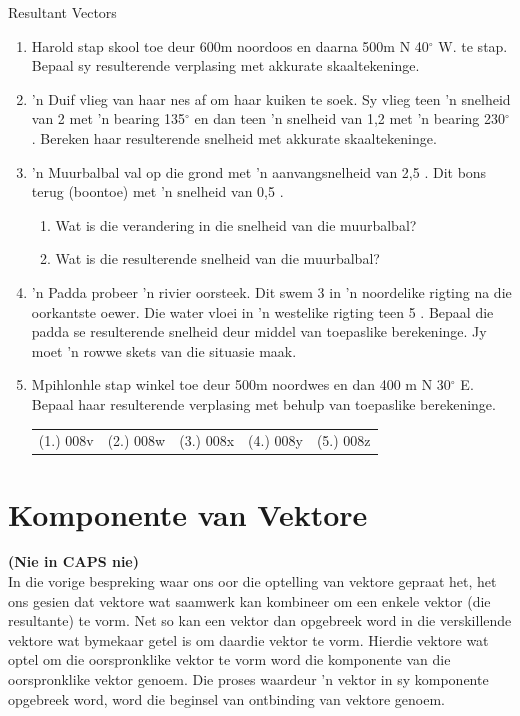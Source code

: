 \begin{exercises}{Resultant Vectors}{ \noindent\vspace{-1cm}
\begin{enumerate}[noitemsep, label=\textbf{\arabic*}.]
\item Harold stap skool toe deur 600m noordoos en daarna 500m N 40$^\circ$ W. te stap. Bepaal sy resulterende verplasing met akkurate skaaltekeninge.
\item  'n Duif vlieg van haar nes af om haar kuiken te soek. Sy vlieg teen  'n snelheid van 2 \ms met  'n bearing 135$^\circ$ en dan teen  'n snelheid van 1,2 \ms met  'n bearing 230$^\circ$. Bereken haar resulterende snelheid met akkurate skaaltekeninge.
\item  'n Muurbalbal val op die grond met  'n aanvangsnelheid van 2,5 \ms. Dit bons terug (boontoe) met  'n snelheid van 0,5 \ms. \begin{enumerate}
	\item Wat is die verandering in die snelheid van die muurbalbal?
	\item Wat is die resulterende snelheid van die muurbalbal?
	\end{enumerate}
\item  'n Padda probeer  'n rivier oorsteek. Dit swem 3 \ms in  'n noordelike rigting na die oorkantste oewer. Die water vloei in  'n westelike rigting teen 5 \ms. Bepaal die padda se resulterende snelheid deur middel van toepaslike berekeninge. Jy moet  'n rowwe skets van die situasie maak.
\item Mpihlonhle stap winkel toe deur 500m noordwes en dan 400 m N 30$^\circ$ E. Bepaal haar resulterende verplasing met behulp van toepaslike berekeninge.
  \label{59e414b70efc194a27a122db47d06ce6**end}
\par \practiceinfo
 \par \begin{tabular}[h]{ccccc}
 (1.) 008v  &  (2.) 008w  &  (3.) 008x &  (4.) 008y  &  (5.) 008z\end{tabular}
\end{enumerate}
}
\end{exercises}



\section{Komponente van Vektore}
\textbf{(Nie in CAPS nie)}\\
In die vorige bespreking waar ons oor die optelling van vektore gepraat het, het ons gesien dat vektore wat saamwerk kan kombineer om een enkele vektor (die resultante) te vorm. Net so kan een vektor dan opgebreek word in die verskillende vektore wat bymekaar getel is om daardie vektor te vorm. Hierdie vektore wat optel om die oorspronklike vektor te vorm word die komponente van die oorspronklike vektor genoem. Die proses waardeur  'n vektor in sy komponente opgebreek word, word die beginsel van ontbinding van vektore genoem.

